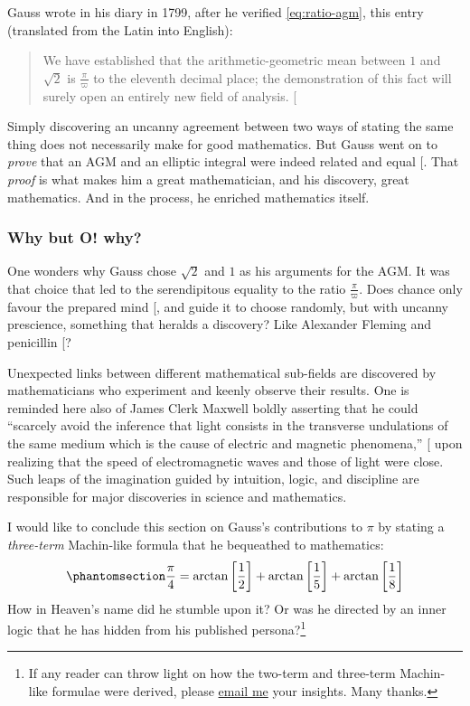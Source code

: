 \documentclass[
  a4paper,
]{article}
\begin{document}
Gauss wrote in his diary in 1799, after he verified \cref{eq:ratio-agm},
this entry (translated from the Latin into English):

\begin{quote}
We have established that the arithmetic-geometric mean between \(1\) and
\(\sqrt{2}\) is \(\frac{\pi}{\varpi}\) to the eleventh decimal place;
the demonstration of this fact will surely open an entirely new field of
analysis. {[}\citeproc{ref-cox-1984}{33}{]}
\end{quote}

Simply discovering an uncanny agreement between two ways of stating the
same thing does not necessarily make for good mathematics. But Gauss
went on to \emph{prove} that an AGM and an elliptic integral were indeed
related and equal {[}\citeproc{ref-singh-2009}{37}{]}. That \emph{proof}
is what makes him a great mathematician, and his discovery, great
mathematics. And in the process, he enriched mathematics itself.

\subsubsection{Why but O! why?}\label{why-but-o-why}

One wonders why Gauss chose \(\sqrt{2}\) and \(1\) as his arguments for
the AGM. It was that choice that led to the serendipitous equality to
the ratio \(\frac{\pi}{\varpi}\). Does chance only favour the prepared
mind {[}\citeproc{ref-chance}{38}{]}, and guide it to choose randomly,
but with uncanny prescience, something that heralds a discovery? Like
Alexander Fleming and penicillin {[}\citeproc{ref-penicillin}{39}{]}?

Unexpected links between different mathematical sub-fields are
discovered by mathematicians who experiment and keenly observe their
results. One is reminded here also of James Clerk Maxwell boldly
asserting that he could ``scarcely avoid the inference that light
consists in the transverse undulations of the same medium which is the
cause of electric and magnetic phenomena,''
{[}\citeproc{ref-maxwell}{40}{]} upon realizing that the speed of
electromagnetic waves and those of light were close. Such leaps of the
imagination guided by intuition, logic, and discipline are responsible
for major discoveries in science and mathematics.

I would like to conclude this section on Gauss's contributions to
\(\pi\) by stating a \emph{three-term} Machin-like formula that he
bequeathed to mathematics:
\begin{equation}\phantomsection\label{eq:gauss-machin}{
\frac{\pi}{4} = \arctan \left[\frac{1}{2}\right] + \arctan \left[\frac{1}{5}\right] + \arctan \left[\frac{1}{8}\right]
}\end{equation} How in Heaven's name did he stumble upon it? Or was he
directed by an inner logic that he has hidden from his published
persona?\footnote{If any reader can throw light on how the two-term and
  three-term Machin-like formulae were derived, please
  \href{mailto:feedback.swanlotus@gmail.com}{email me} your insights.
  Many thanks.}
\end{document}
